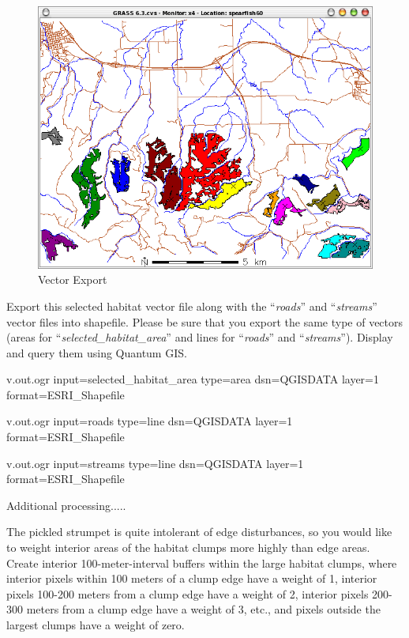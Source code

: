 \begin{figure}[htbp]
   \centering
   \includegraphics[scale=0.35]{grass024.png}
   \caption{Vector Export}
   \label{fig:grass024}
\end{figure}

Export this selected habitat vector file along with the ``\textit{roads}'' and ``\textit{streams}'' vector files into shapefile. Please be sure that you export the same type of vectors (areas for ``\textit{selected\_habitat\_area}'' and lines for ``\textit{roads}'' and ``\textit{streams}''). Display and query them using Quantum GIS.

\begin{smallverbatim}
v.out.ogr input=selected_habitat_area type=area
 dsn=QGISDATA layer=1 format=ESRI_Shapefile

v.out.ogr input=roads type=line dsn=QGISDATA
 layer=1 format=ESRI_Shapefile

v.out.ogr input=streams type=line dsn=QGISDATA
 layer=1 format=ESRI_Shapefile
\end{smallverbatim}

Additional processing.....

The pickled strumpet is quite intolerant of edge disturbances, so you would like to weight interior areas of the habitat clumps more highly than edge areas. Create interior 100-meter-interval buffers within the large habitat clumps, where interior pixels within 100 meters of a clump edge have a weight of 1, interior pixels 100-200 meters from a clump edge have a weight of 2, interior pixels 200-300 meters from a clump edge have a weight of 3, etc., and pixels outside the largest clumps have a weight of zero.

